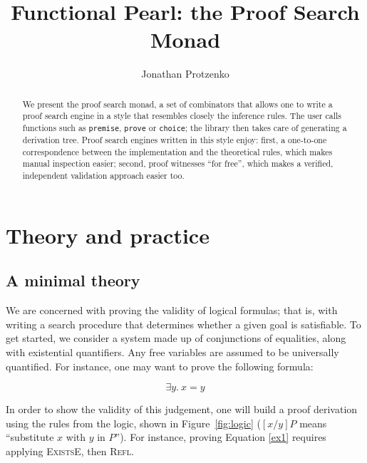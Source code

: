 \documentclass{easychair}
\def\li{\lstinline}
\let\Rule\textsc
\newcommand{\fref}[1]{Figure~\ref{fig:#1}}
\begin{document}
\title{Functional Pearl: the Proof Search Monad}

\author{Jonathan Protzenko}

\maketitle

\begin{abstract}
  We present the proof search monad, a set of combinators that allows one to
  write a proof search engine in a style that resembles closely the inference
  rules. The user calls functions such as \li+premise+, \li+prove+ or
  \li+choice+; the library then takes care of generating a derivation tree.
  Proof search engines written in this style enjoy: first, a one-to-one
  correspondence between the implementation and the theoretical rules, which
  makes manual inspection easier; second, proof witnesses ``for free'', which
  makes a verified, independent validation approach easier too.
\end{abstract}

\section{Theory and practice}

\subsection{A minimal theory}

We are concerned with proving the validity of logical formulas; that is, with
writing a search procedure that determines whether a given goal is satisfiable.
To get started, we consider a system made up of conjunctions of equalities,
along with existential quantifiers. Any free variables are assumed to be
universally quantified. For instance, one may want to prove the following
formula:

\begin{equation}
  \exists y.\ x = y
  \label{ex1}
\end{equation}

In order to show the validity of this judgement, one will build a proof
derivation using the rules from the logic, shown in \fref{logic} ($[x/y]P$ means
``substitute $x$ with $y$ in $P$''). For instance, proving Equation \ref{ex1}
requires applying \Rule{ExistsE}, then \Rule{Refl}.
\end{document}
